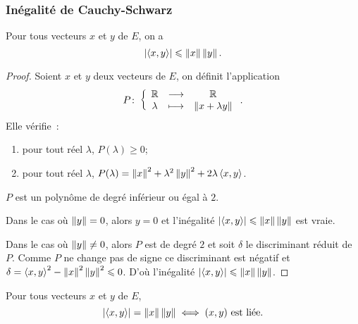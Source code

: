 \subsubsection{Inégalité de Cauchy-Schwarz}

\begin{theo}
  Pour tous vecteurs \(x\) et \(y\) de \(E\), on a
  \begin{equation}
    \left\lvert\left\langle{x},{y}\right\rangle\right\rvert \leqslant \left\lVert x\right\rVert\left\lVert y\right\rVert.
  \end{equation}
\end{theo}
\begin{proof}
  Soient \(x\) et \(y\) deux vecteurs de \(E\), on définit l'application
  \begin{equation}
    P\colon \left\{\begin{array}{ccc} \mathbb{R} & \longrightarrow &\mathbb{R}\\ \lambda & \longmapsto & \left\lVert x+\lambda y\right\rVert \end{array} \right..
  \end{equation}
  Elle vérifie~:
  \begin{enumerate}
  \item pour tout réel \(\lambda\), \(P(\lambda)\geqslant 0\);
  \item pour tout réel \(\lambda\), \(P(\lambda) = \left\lVert x\right\rVert^2+\lambda^2\left\lVert y\right\rVert^2+2\lambda\left\langle{x},{y}\right\rangle\).
  \end{enumerate}
  \(P\) est un polynôme de degré inférieur ou égal à \(2\). 

  Dans le cas où \(\left\lVert y\right\rVert=0\), alors \(y=0\) et l'inégalité \(\left\lvert\left\langle{x},{y}\right\rangle\right\rvert \leqslant \left\lVert x\right\rVert\left\lVert y\right\rVert\) est vraie.

  Dans le cas où \(\left\lVert y\right\rVert\neq 0\), alors \(P\) est de degré \(2\) et soit \(\delta\) le discriminant réduit de \(P\). Comme \(P\) ne change pas de signe ce discriminant est négatif et \(\delta=\left\langle{x},{y}\right\rangle^2-\left\lVert x\right\rVert^2\left\lVert y\right\rVert^2\leqslant 0\). D'où l'inégalité \(\left\lvert\left\langle{x},{y}\right\rangle\right\rvert \leqslant \left\lVert x\right\rVert\left\lVert y\right\rVert\).
\end{proof}
%
\begin{prop}
  Pour tous vecteurs \(x\) et \(y\) de \(E\),
  \begin{equation}
    \left\lvert\left\langle{x},{y}\right\rangle\right\rvert=\left\lVert x\right\rVert\left\lVert y\right\rVert \iff (x,y) \text{~est liée}.
  \end{equation}
\end{prop}
